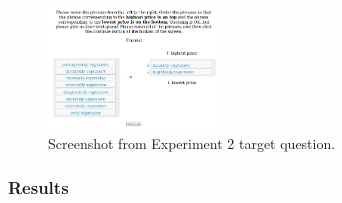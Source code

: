 \documentclass[10pt,letterpaper]{article}
\begin{document}
\begin{figure}[hbt]
\begin{center}
\includegraphics[width=0.4\textwidth]{exp2-q.png}
\end{center}
\caption{Screenshot from Experiment 2 target question.} 
\label{exp2-q}
\end{figure}


\subsubsection{Results}
\end{document}
